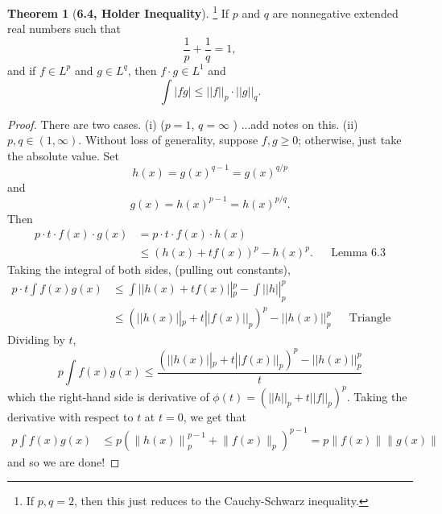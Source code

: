 \documentclass[12pt]{article}
\theoremstyle{definition}
\newtheorem*{thm}{Theorem}
\begin{document}
\begin{thm}[\textbf{6.4, Holder Inequality}]\footnote{If \( p,q  = 2 \), then this just reduces to the Cauchy-Schwarz inequality.} If \( p \) and \( q \) are nonnegative extended real numbers such that 
    \[
        \frac{1}{p} + \frac{1}{q} = 1,  
    \]
and if \( f \in L^p \) and \( g \in L^q \), then \( f \cdot g \in L^1 \) and 
    \[
        \int | f g | \leq ||f||_{p} \cdot ||g||_{q}. 
    \]

    \begin{proof}
        There are two cases. (i) (\(p =1 \), \( q = \infty\) ) ...add notes on this.  (ii) \( p, q \in (1, \infty) \). Without loss of generality, suppose \( f, g \geq 0 \); otherwise, just take the absolute value. Set 
                \[
                    h(x) = g(x)^{q - 1} = g(x)^{q/p}    
                \]
            and 
                \[
                    g(x) = h(x)^{p-1} = h(x)^{p/q}.  
                \]
            Then 
                \begin{align*}
                    p \cdot t \cdot f(x) \cdot g(x) &= p \cdot t \cdot f(x) \cdot h(x) \\
                    &\leq (h(x) + tf(x))^{p} - h(x)^{p}.  && \text{Lemma 6.3}
                \end{align*}
            Taking the integral of both sides, (pulling out constants),
                \begin{align*}
                    p \cdot t \int f(x) g(x) &\leq \int \left|| h(x) + t f(x) \right||^{p}_{p} - \int \left|| h \right||^{p}_{p} \\
                    &\leq \left( \left||h(x) \right||_{p} + t ||f(x)||_{p} \right)^{p} - ||h(x)||^{p}_{p} && \text{Triangle inequality}\
                \end{align*}
            Dividing by \( t \),
                \[
                    p \int f(x) g(x) \leq\frac{\left( \left||h(x) \right||_{p} + t ||f(x)||_{p} \right)^{p} - ||h(x)||^{p}_{p}}{t}
                \]
            which the right-hand side is derivative of \( \phi(t) = \left( ||h||_p + t||f||_p \right)^{p} \). Taking the derivative with respect to \( t \) at \( t = 0 \), we get that 
                \begin{align*}
                    p \int f(x) g(x) &\leq  p \left( \left\lVert h(x) \right\rVert_p^{p-1} + \lVert f(x) \rVert_p \right)^{p-1} = p \lVert f(x) \rVert \lVert g(x) \rVert
                \end{align*}
            and so we are done!
    \end{proof}

\end{thm}
\end{document}
